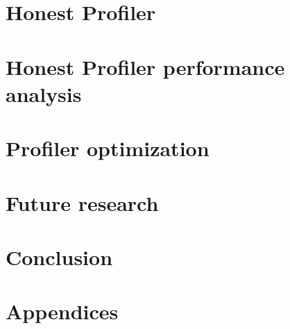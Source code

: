\documentclass{style/thesis}
\begin{document}
\pagebreak


\section{Honest Profiler}
\label{sec:honest-profiler}

\pagebreak

\section{Honest Profiler performance analysis}
\label{sec:perf-analysis}

\pagebreak



\section{Profiler optimization}
\label{sec:optimization}


\pagebreak
\section{Future research}
\label{sec:future-research}


\clearpage
\section{Conclusion} 



\newpage

\def\urlprefix{}
\nocite{*}
{}



\newpage

\appendix
\section*{Appendices}
\renewcommand{\thesubsection}{\Alph{subsection}}

\end{document}
